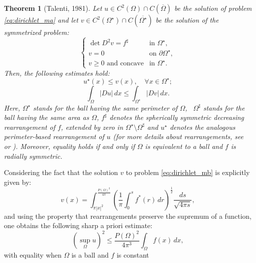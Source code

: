 \documentclass[10pt,a4paper]{amsart}
\newtheorem{theorem}{Theorem}[section]
\numberwithin{equation}{section}
\begin{document}
\begin{theorem}[Talenti, 1981]
    Let $u \in C^2(\Omega) \cap C(\overline{\Omega})$ be the solution of problem \eqref{eq:dirichlet_ma} and let $v \in C^2(\Omega^\star) \cap C(\overline{\Omega^\star})$ be the solution of the symmetrized problem:
    \begin{equation}\label{eq:dirichlet_mb}
    \begin{cases} 
    \det D^2v = f^\sharp & \text{in } \Omega^\star, \\ 
    v = 0 & \text{on } \partial \Omega^\star, \\
    v \geq 0 \text{ and concave} & \text{in } \Omega^\star.
    \end{cases}
    \end{equation}
    Then, the following estimates hold:
    \begin{equation}\label{eq:comparison1}
        u^\star(x) \leq v(x), \quad \forall x \in \Omega^\star;
    \end{equation}
    \begin{equation}\label{eq:comparison2}
        \int_{\Omega} |Du|\,dx \leq \int_{\Omega^\star} |Dv|\,dx.
    \end{equation}
    Here, $\Omega^\star$ stands for the ball having the same perimeter of $\Omega$, \ $\Omega^\sharp$ stands for the ball having the same area as $\Omega$, $f^\sharp$ denotes the spherically symmetric decreasing rearrangement of $f$, extended by zero in $\Omega^\star \setminus \Omega^\sharp$ and $u^\star$ denotes the analogous perimeter-based rearrangement of $u$ (for more details about rearrangements, see \cite{talenti1981} or \cite{tso1989}). Moreover, equality holds if and only if $\Omega$ is equivalent to a ball and $f$ is radially symmetric.
\end{theorem}
\noindent Considering the fact that the solution $v$ to problem \eqref{eq:dirichlet_mb} is explicitly given by:
\begin{equation}
   v(x) = \int_{\pi|x|^2}^{\frac{P(\Omega)^2}{4\pi}} \left( \frac{1}{\pi} \int_0^s f^*(r)\,dr \right)^\frac{1}{2} \frac{ds}{\sqrt{4\pi s}},
\end{equation} 
and using the property that rearrangements preserve the supremum of a function, one obtains the following sharp a priori estimate:
\begin{equation}
    (\sup_\Omega u)^2 \leq \frac{P(\Omega)^2}{4\pi^3}\int_\Omega f(x)\,dx,
\end{equation}
with equality when $\Omega$ is a ball and $f$ is constant
\end{document}
